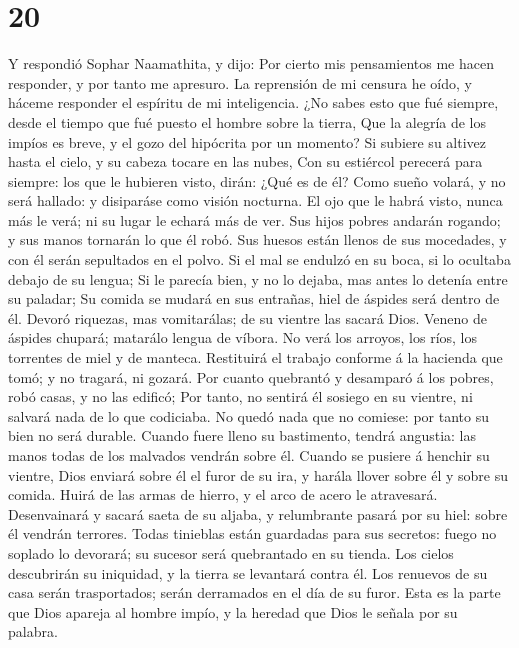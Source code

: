 \hypertarget{section-19}{%
\section{20}\label{section-19}}

 Y respondió Sophar Naamathita, y dijo:  Por
cierto mis pensamientos me hacen responder, y por tanto me apresuro.
 La reprensión de mi censura he oído, y háceme responder el
espíritu de mi inteligencia.  ¿No sabes esto que fué
siempre, desde el tiempo que fué puesto el hombre sobre la tierra,
 Que la alegría de los impíos es breve, y el gozo del
hipócrita por un momento?  Si subiere su altivez hasta el
cielo, y su cabeza tocare en las nubes,  Con su estiércol
perecerá para siempre: los que le hubieren visto, dirán: ¿Qué es de él?
 Como sueño volará, y no será hallado: y disiparáse como
visión nocturna.  El ojo que le habrá visto, nunca más le
verá; ni su lugar le echará más de ver.  Sus hijos pobres
andarán rogando; y sus manos tornarán lo que él robó.  Sus
huesos están llenos de sus mocedades, y con él serán sepultados en el
polvo.  Si el mal se endulzó en su boca, si lo ocultaba
debajo de su lengua;  Si le parecía bien, y no lo dejaba,
mas antes lo detenía entre su paladar;  Su comida se mudará
en sus entrañas, hiel de áspides será dentro de él.  Devoró
riquezas, mas vomitarálas; de su vientre las sacará Dios. 
Veneno de áspides chupará; matarálo lengua de víbora.  No
verá los arroyos, los ríos, los torrentes de miel y de manteca.
 Restituirá el trabajo conforme á la hacienda que tomó; y
no tragará, ni gozará.  Por cuanto quebrantó y desamparó á
los pobres, robó casas, y no las edificó;  Por tanto, no
sentirá él sosiego en su vientre, ni salvará nada de lo que codiciaba.
 No quedó nada que no comiese: por tanto su bien no será
durable.  Cuando fuere lleno su bastimento, tendrá
angustia: las manos todas de los malvados vendrán sobre él.
 Cuando se pusiere á henchir su vientre, Dios enviará sobre
él el furor de su ira, y harála llover sobre él y sobre su comida.
 Huirá de las armas de hierro, y el arco de acero le
atravesará.  Desenvainará y sacará saeta de su aljaba, y
relumbrante pasará por su hiel: sobre él vendrán terrores. 
Todas tinieblas están guardadas para sus secretos: fuego no soplado lo
devorará; su sucesor será quebrantado en su tienda.  Los
cielos descubrirán su iniquidad, y la tierra se levantará contra él.
 Los renuevos de su casa serán trasportados; serán
derramados en el día de su furor.  Esta es la parte que
Dios apareja al hombre impío, y la heredad que Dios le señala por su
palabra.

